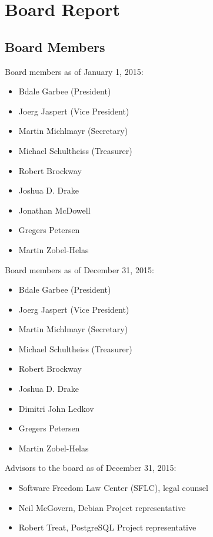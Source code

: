 \documentclass[letterpaper]{report}
\begin{document}
\chapter{Board Report}
\section{Board Members}

Board members as of January 1, 2015:

\begin{itemize}
\item Bdale Garbee (President)
\item Joerg Jaspert (Vice President)
\item Martin Michlmayr (Secretary)
\item Michael Schultheiss (Treasurer)
\item Robert Brockway
\item Joshua D. Drake
\item Jonathan McDowell
\item Gregers Petersen
\item Martin Zobel-Helas
\end{itemize}

Board members as of December 31, 2015:

\begin{itemize}
\item Bdale Garbee (President)
\item Joerg Jaspert (Vice President)
\item Martin Michlmayr (Secretary)
\item Michael Schultheiss (Treasurer)
\item Robert Brockway
\item Joshua D. Drake
\item Dimitri John Ledkov
\item Gregers Petersen
\item Martin Zobel-Helas
\end{itemize}

Advisors to the board as of December 31, 2015:

\begin{itemize}
\item Software Freedom Law Center (SFLC), legal counsel
\item Neil McGovern, Debian Project representative
\item Robert Treat, PostgreSQL Project representative
\end{itemize}
\end{document}
